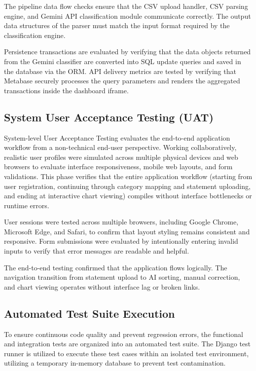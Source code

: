 The pipeline data flow checks ensure that the CSV upload handler, CSV parsing engine, and Gemini API classification module communicate correctly. The output data structures of the parser must match the input format required by the classification engine.

Persistence transactions are evaluated by verifying that the data objects returned from the Gemini classifier are converted into SQL update queries and saved in the database via the ORM. API delivery metrics are tested by verifying that Metabase securely processes the query parameters and renders the aggregated transactions inside the dashboard iframe.

\subsection{System User Acceptance Testing (UAT)}
System-level User Acceptance Testing evaluates the end-to-end application workflow from a non-technical end-user perspective. Working collaboratively, realistic user profiles were simulated across multiple physical devices and web browsers to evaluate interface responsiveness, mobile web layouts, and form validations. This phase verifies that the entire application workflow (starting from user registration, continuing through category mapping and statement uploading, and ending at interactive chart viewing) compiles without interface bottlenecks or runtime errors.

User sessions were tested across multiple browsers, including Google Chrome, Microsoft Edge, and Safari, to confirm that layout styling remains consistent and responsive. Form submissions were evaluated by intentionally entering invalid inputs to verify that error messages are readable and helpful.

The end-to-end testing confirmed that the application flows logically. The navigation transition from statement upload to AI sorting, manual correction, and chart viewing operates without interface lag or broken links.

\subsection{Automated Test Suite Execution}
To ensure continuous code quality and prevent regression errors, the functional and integration tests are organized into an automated test suite. The Django test runner is utilized to execute these test cases within an isolated test environment, utilizing a temporary in-memory database to prevent test contamination.

